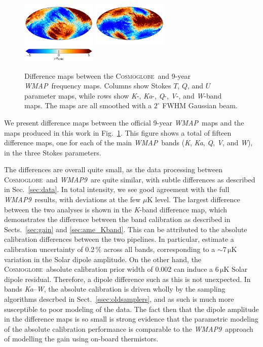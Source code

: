 \documentclass[twocolumn]{../../common/aa}
\def\WMAP{\emph{WMAP}}
\def\WMAPnine{\emph{WMAP9}}
\newcommand{\cosmoglobe}{\textsc{Cosmoglobe}}
\newcommand{\K}[0]{\textit K}
\newcommand{\Ka}[0]{\textit{Ka}}
\newcommand{\Q}[0]{\textit Q}
\newcommand{\V}[0]{\textit V}
\newcommand{\W}[0]{\textit W}
\begin{document}
\begin{figure}
        \includegraphics[width=0.32\textwidth]{figures/megadiff_W_Q.pdf}
        \includegraphics[width=0.32\textwidth]{figures/megadiff_W_U.pdf}\\\vspace*{-4mm}
	\includegraphics[width=0.32\textwidth]{figures/cbar_5uK_cmb.pdf}
	\caption{Difference maps between the \cosmoglobe\ and 9-year \WMAP\ frequency maps. Columns show Stokes $T$, $Q$, and $U$ parameter maps, while rows show \K-, \Ka-, \Q-, \V-, and \W-band maps. The maps are all smoothed with a $2^\circ$ FWHM Gaussian beam.}
        \label{fig:megadiff_wmap}
\end{figure}

We present difference maps between the official 9-year \WMAP\ maps and the maps produced in this work in Fig.~\ref{fig:megadiff_wmap}. This figure shows a total of fifteen difference maps, one for each of the main \WMAP\ bands (\K, \Ka, \Q, \V, and \W), in the three Stokes parameters. 

The differences are overall quite small, as the data processing between \cosmoglobe\ and \WMAPnine\ are quite similar, with subtle differences as described in Sec.~\ref{sec:data}. In total intensity, we see good agreement with the full \WMAPnine\ results, with deviations at the few $\mu\mathrm{K}$ level. The largest difference between the two analyses is shown in the \K-band difference map, which demonstrates the difference between the band calibration as described in Sects.~\ref{sec:gain} and \ref{sec:ame_Kband}.
This can be attributed to the absolute calibration differences between the two pipelines. In particular, \citet{bennett2012} estimate a calibration uncertainty of 0.2\,\% across all bands, corresponding to a $\sim7\,\mathrm{\mu K}$ variation in the Solar dipole amplitude.
On the other hand, the  \cosmoglobe\ absolute calibration prior width of 0.002 can induce a $6\,\mathrm{\mu K}$ Solar dipole residual. Therefore, a dipole difference such as this is not unexpected.
In bands \Ka--\W, the absolute calibration is driven wholly by the sampling algorithms descrbed in Sect.~\ref{ssec:oldsamplers}, and as such is much more susceptible to poor modeling of the data. The fact then that the dipole amplitude in the difference maps is so small is strong evidence that the parametric modeling of the absolute calibration performance is comparable to the \WMAPnine\ approach of modelling the gain using on-board thermistors.
\end{document}
